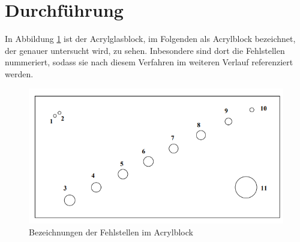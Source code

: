 \section{Durchführung}
\label{sec:Durchführung}
In Abbildung \ref{fig:acrylblock} ist der Acrylglasblock, im Folgenden als Acrylblock bezeichnet,
der genauer untersucht wird, zu sehen. Inbesondere sind dort die Fehlstellen nummeriert, sodass
sie nach diesem Verfahren im weiteren Verlauf referenziert werden.

\begin{figure}
  \centering
  \includegraphics[width=\textwidth]{data/acrylblock.png}
  \caption{Bezeichnungen der Fehlstellen im Acrylblock\,\cite{Versuchsanleitung}}
  \label{fig:acrylblock}
\end{figure}

